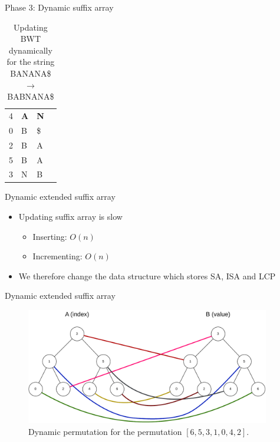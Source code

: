 \documentclass[aspectratio=1610, xcolor=table]{beamer}
\begin{document}
\begin{frame}[fragile]{Phase 3: Dynamic suffix array}
\begin{table}
\begin{center}
{\begin{tabular}{c | l | l l}
					4     & \textbf{A} & \textbf{N} &                                 \\
					0     & B          & \$         &                                 \\
					2     & B          & A          &                                 \\
					5     & B          & A          &                                 \\
					3     & N          & B          &                                 \\
				\end{tabular}
			}
			\caption{Updating BWT dynamically for the string BANANA\$ $\rightarrow$ BABNANA\$}
			\label{table:bwtupdatestages}
		\end{center}
	\end{table}
\end{frame}

\begin{frame}[fragile]{Dynamic extended suffix array}
    \begin{itemize}
        \item Updating suffix array is slow
            \begin{itemize}
                \item Inserting: $O(n)$
                \item Incrementing: $O(n)$
            \end{itemize}
        \item We therefore change the data structure which stores SA, ISA and LCP
    \end{itemize}
\end{frame}

\begin{frame}[fragile]{Dynamic extended suffix array}
	\begin{figure}[t]
		\begin{center}
			\includegraphics[width=0.95\textwidth]{figures/dynamicpermutation.drawio.pdf}
		\end{center}
		\caption{Dynamic permutation for the permutation $[6,5,3,1,0,4,2]$.}
		\label{fig:dynamicpermutation}
	\end{figure}
\end{frame}
\end{document}
